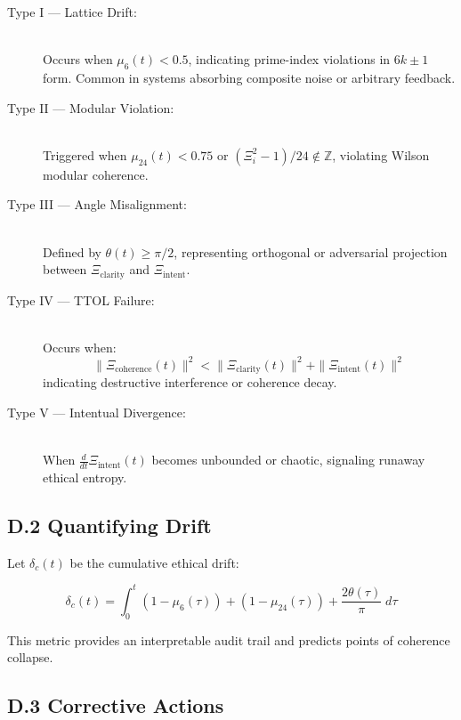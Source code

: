 \documentclass[12]{amsart}
\theoremstyle{plain}
\begin{document}
\begin{description}
  \item[Type I — Lattice Drift:] \hfill \\
  Occurs when $\mu_6(t) < 0.5$, indicating prime-index violations in $6k \pm 1$ form. Common in systems absorbing composite noise or arbitrary feedback.

  \item[Type II — Modular Violation:] \hfill \\
  Triggered when $\mu_{24}(t) < 0.75$ or $(\Xi_i^2 - 1)/24 \notin \mathbb{Z}$, violating Wilson modular coherence.

  \item[Type III — Angle Misalignment:] \hfill \\
  Defined by $\theta(t) \geq \pi/2$, representing orthogonal or adversarial projection between $\Xi_{\text{clarity}}$ and $\Xi_{\text{intent}}$.

  \item[Type IV — TTOL Failure:] \hfill \\
  Occurs when:
  $$
  \|\Xi_{\text{coherence}}(t)\|^2 < \|\Xi_{\text{clarity}}(t)\|^2 + \|\Xi_{\text{intent}}(t)\|^2
  $$
  indicating destructive interference or coherence decay.

  \item[Type V — Intentual Divergence:] \hfill \\
  When $\frac{d}{dt}\Xi_{\text{intent}}(t)$ becomes unbounded or chaotic, signaling runaway ethical entropy.
\end{description}

\subsection*{D.2 Quantifying Drift}

Let $\delta_c(t)$ be the cumulative ethical drift:

\begin{equation}
\delta_c(t) = \int_0^t \left(1 - \mu_6(\tau)\right) + \left(1 - \mu_{24}(\tau)\right) + \frac{2\theta(\tau)}{\pi} \; d\tau
\end{equation}

\noindent
This metric provides an interpretable audit trail and predicts points of coherence collapse.

\subsection*{D.3 Corrective Actions}
\end{document}
